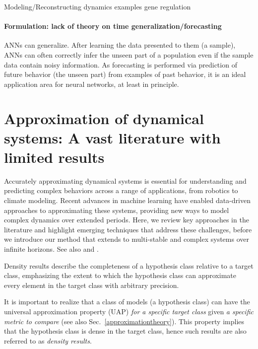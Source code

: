 \documentclass{article}
\theoremstyle{definition}
\theoremstyle{remark}
\newcounter{ct}
\begin{document}

Modeling/Reconstructing dynamics examples 
gene regulation \citep{paczko2024neural}


\paragraph{Formulation: lack of theory on time generalization/forecasting}
ANNs can generalize. After learning the data presented to them (a sample), ANNs can often correctly infer the unseen part of a population even if the sample data contain noisy information. As forecasting is performed via prediction of future behavior (the unseen part) from examples of past behavior, it is an ideal application area for neural networks, at least in principle. \citep{zhang1998forecasting}



\section{Approximation of dynamical systems: A vast literature with limited results}

Accurately approximating dynamical systems is essential for understanding and predicting complex behaviors across a range of applications, from robotics to climate modeling.
Recent advances in machine learning have enabled data-driven approaches to approximating these systems, providing new ways to model complex dynamics over extended periods.
Here, we review key approaches in the literature and highlight emerging techniques that address these challenges, before we introduce our method that extends to multi-stable and complex systems over infinite horizons.
%
See also \citep{li2022approximation} and \citep{jiang2023brief}.

Density results describe the completeness of a hypothesis class relative to a target class, emphasizing the extent to which the hypothesis class can approximate every element in the target class with arbitrary precision.


It is important to realize that a class of models (a hypothesis class) can have the universal approximation property (UAP) \emph{for a specific target class} given \emph{a specific metric to compare} (see also Sec.~\ref{approximationtheory}).
This property implies that the hypothesis class is dense in the target class, hence such results are also referred to as \emph{density results}.
\end{document}
